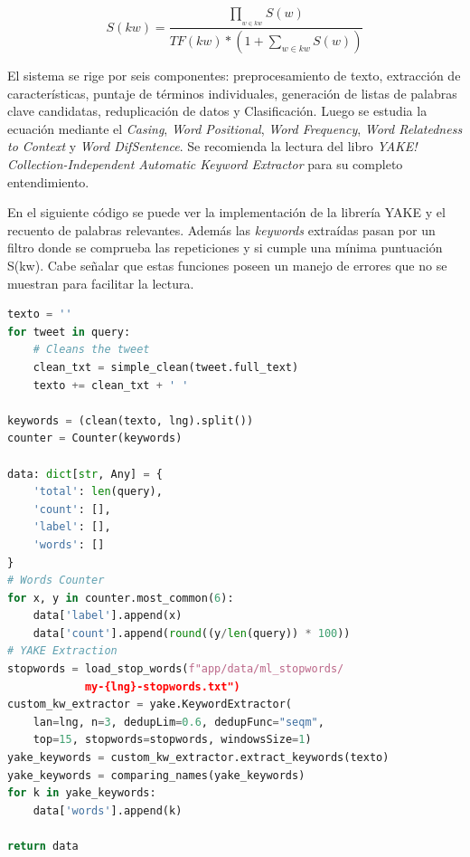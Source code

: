 \begin{equation}
S(kw)=\frac{\prod_{_{w \in kw}}^{}S(w)}{TF(kw)*(1+\sum_{w \in kw}^{}S(w))}
\end{equation}

\vspace{0.3cm}

El sistema se rige por seis componentes: preprocesamiento de texto, extracción de características, puntaje de términos individuales, generación de listas de palabras clave candidatas, reduplicación de datos y Clasificación. Luego se estudia la ecuación mediante el \textit{Casing}, \textit{Word Positional}, \textit{Word Frequency}, \textit{Word Relatedness to Context} y \textit{Word DifSentence}. Se recomienda la lectura del libro \textit{YAKE! Collection-Independent Automatic Keyword Extractor} para su completo entendimiento. \cite{yake-libro}

\vspace{0.3cm}

En el siguiente código se puede ver la implementación de la librería \ac{YAKE} y el recuento de palabras relevantes. Además las \textit{keywords} extraídas pasan por un filtro donde se comprueba las repeticiones y si cumple una mínima puntuación S(kw). Cabe señalar que estas funciones poseen un manejo de errores que no se muestran para facilitar la lectura.

\vspace{0.3cm}

\begin{lstlisting}[caption=Extracción de recuento de palabras y \textit{keywords},          label={lst:listing-python},language=Python]
texto = ''
for tweet in query:
    # Cleans the tweet
    clean_txt = simple_clean(tweet.full_text)
    texto += clean_txt + ' '

keywords = (clean(texto, lng).split())
counter = Counter(keywords)

data: dict[str, Any] = {
    'total': len(query),
    'count': [],
    'label': [],
    'words': []
}
# Words Counter
for x, y in counter.most_common(6):
    data['label'].append(x)
    data['count'].append(round((y/len(query)) * 100))
# YAKE Extraction
stopwords = load_stop_words(f"app/data/ml_stopwords/
            my-{lng}-stopwords.txt")
custom_kw_extractor = yake.KeywordExtractor(
    lan=lng, n=3, dedupLim=0.6, dedupFunc="seqm",
    top=15, stopwords=stopwords, windowsSize=1)
yake_keywords = custom_kw_extractor.extract_keywords(texto)
yake_keywords = comparing_names(yake_keywords)
for k in yake_keywords:
    data['words'].append(k)

return data
\end{lstlisting}

